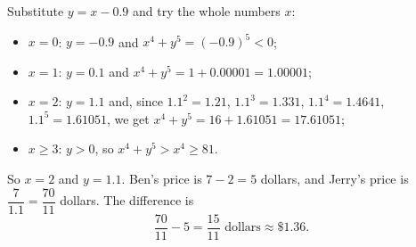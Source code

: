 Substitute $y=x-0.9$ and try the whole numbers $x$:
\begin{itemize}
\item $x=0$: $y=-0.9$ and $x^4+y^5=(-0.9)^5<0$;
\item $x=1$: $y=0.1$ and $x^4+y^5=1+0.00001=1.00001$;
\item $x=2$: $y=1.1$ and, since $1.1^2=1.21$, $1.1^3=1.331$, $1.1^4=1.4641$, $1.1^5=1.61051$, we get $x^4+y^5=16+1.61051=17.61051$;
\item $x\ge3$: $y>0$, so $x^4+y^5>x^4\ge81$.
\end{itemize}
So $x=2$ and $y=1.1$. Ben's price is $7-2=5$ dollars, and Jerry's price is $\dfrac{7}{1.1}=\dfrac{70}{11}$ dollars. The difference is
\[\dfrac{70}{11}-5=\boxed{\dfrac{15}{11}}\text{ dollars}\approx\$1.36.\]
